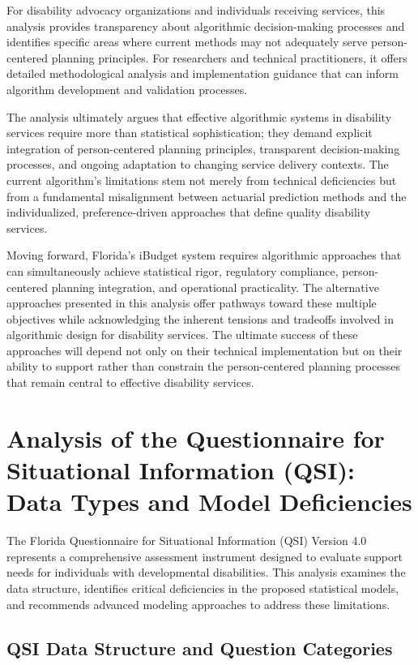 \documentclass[12pt]{article}
\begin{document}
For disability advocacy organizations and individuals receiving services, this analysis provides transparency about algorithmic decision-making processes and identifies specific areas where current methods may not adequately serve person-centered planning principles. For researchers and technical practitioners, it offers detailed methodological analysis and implementation guidance that can inform algorithm development and validation processes.

The analysis ultimately argues that effective algorithmic systems in disability services require more than statistical sophistication; they demand explicit integration of person-centered planning principles, transparent decision-making processes, and ongoing adaptation to changing service delivery contexts. The current algorithm's limitations stem not merely from technical deficiencies but from a fundamental misalignment between actuarial prediction methods and the individualized, preference-driven approaches that define quality disability services.

Moving forward, Florida's iBudget system requires algorithmic approaches that can simultaneously achieve statistical rigor, regulatory compliance, person-centered planning integration, and operational practicality. The alternative approaches presented in this analysis offer pathways toward these multiple objectives while acknowledging the inherent tensions and tradeoffs involved in algorithmic design for disability services. The ultimate success of these approaches will depend not only on their technical implementation but on their ability to support rather than constrain the person-centered planning processes that remain central to effective disability services.


\section{Analysis of the Questionnaire for Situational Information (QSI): Data Types and Model Deficiencies}

The Florida Questionnaire for Situational Information (QSI) Version 4.0 represents a comprehensive assessment instrument designed to evaluate support needs for individuals with developmental disabilities. This analysis examines the data structure, identifies critical deficiencies in the proposed statistical models, and recommends advanced modeling approaches to address these limitations.

\subsection{QSI Data Structure and Question Categories}
\end{document}
